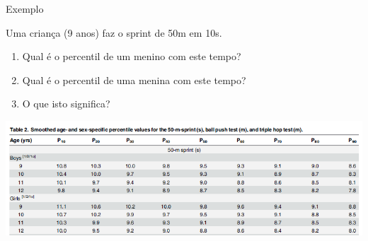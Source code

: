 \documentclass{beamer}
\begin{document}
\begin{frame}{\scriptsize Exemplo}
  \begin{exampleblock}{}
    \footnotesize
    Uma criança (9 anos) faz o sprint de 50m em 10s.

    \begin{enumerate}
      \footnotesize
    \item Qual é o percentil de um menino com este tempo?
    \item Qual é o percentil de uma menina com este tempo?
    \item O que isto significa?
    \end{enumerate}
  \end{exampleblock}
  \begin{center}
    \includegraphics[width=1.2\textwidth]{Cap3/percentil2}
  \end{center}
\end{frame}
\end{document}
